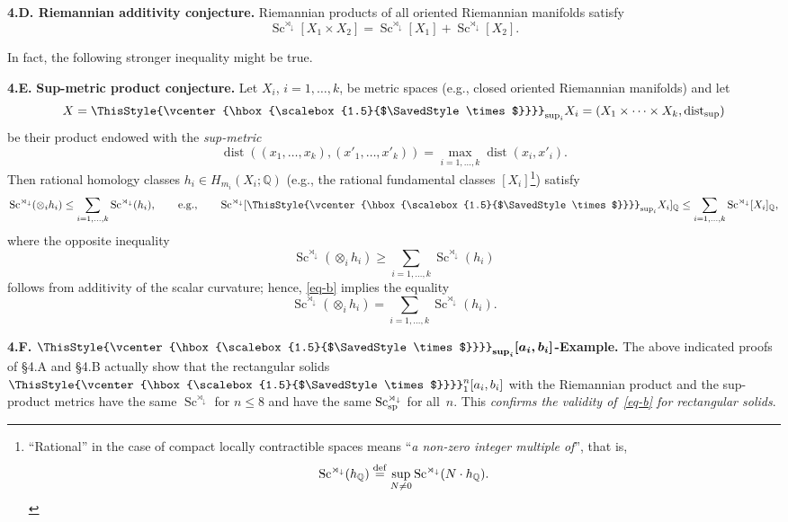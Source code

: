 \documentclass[pdftex]{sigma}
\numberwithin{equation}{section}
\newcommand\bigtimes{\mathbin{\ThisStyle{\vcenter{\hbox{%
\scalebox{1.5}{$\SavedStyle\times$}}}}}}
\begin{document}
\textbf {4.D. Riemannian additivity conjecture.}
Riemannian products of all oriented Riemannian manifolds satisfy
\[
\operatorname{Sc}^{\rtimes_\downarrow}[X_1\times X_2]= \operatorname{Sc}^{\rtimes_\downarrow}[X_1]+ \operatorname{Sc}^{\rtimes_\downarrow}[X_2].
\]

In fact, the following stronger inequality might be true.

\textbf {4.E.} \textbf{Sup-metric product conjecture.} Let $X_i$, $i=1,\dots,k$, be metric spaces (e.g., closed oriented Riemannian
 manifolds) and let
\[
X=\bigtimes_{\sup_i} X_i=
 (X_1
 \times \cdots \times X_k, \operatorname{dist}_{\sup})
 \]
be their product endowed with the {\it sup-metric}
\[
\operatorname{dist}((x_1,\dots,x_k), (x'_1,\dots,x'_k))=\max_{i=1,\dots,k} \operatorname{dist}(x_i, x'_i).
\]
Then rational homology classes $h_i\in H_{m_i}(X_i;\mathbb Q)$ (e.g., the rational fundamental classes $[X_i]$\footnote{``Rational'' in the case of compact locally contractible spaces means ``{\it a non-zero integer multiple of}'', that is,
\[
\operatorname{Sc}^{\rtimes_\downarrow}( h_\mathbb Q) \overset{\rm def}{=}
\sup_{N\neq 0}\operatorname{Sc}^{\rtimes_\downarrow}(N\cdot h_\mathbb Q).
\]})
satisfy
\begin{equation}\label{eq-b}
 \operatorname{Sc}^{\rtimes_\downarrow}( \otimes_i h_i)\leq\sum_{i=1,\dots,k} \operatorname{Sc}^{\rtimes_\downarrow}( h_i ), \qquad \text{e.g.,} \qquad \operatorname{Sc}^{\rtimes_\downarrow}[ \bigtimes_{\sup_i} X_i]_{\mathbb Q}\leq\sum_{i=1,\dots,k} \operatorname{Sc}^{\rtimes_\downarrow} [X_i]_{\mathbb Q},
 \end{equation}
where the opposite inequality
\[
\operatorname{Sc}^{\rtimes_\downarrow}( \otimes_i h_i )\geq\sum_{i=1,\dots,k} \operatorname{Sc}^{\rtimes_\downarrow}( h_i )
\]
follows from additivity of the scalar curvature;
hence, \eqref{eq-b} implies the equality
\[
 \operatorname{Sc}^{\rtimes_\downarrow} ( \otimes_i h_i) =\sum_{i=1,\dots,k} \operatorname{Sc}^{\rtimes_\downarrow} (h_i).
 \]

\textbf{4.F. $\boldsymbol{\bigtimes_{\sup_i}[a_i,b_i]}$-Example.}
The above indicated proofs of \S4.A and \S4.B actually show that the rectangular solids $\bigtimes_1^n[a_i,b_i]$ with the Riemannian product and the sup-product metrics have the same $\operatorname{Sc}^{\rtimes_\downarrow}$ for $n\leq8$ and
have the same $\operatorname{Sc}^{\rtimes_\downarrow}_{\rm sp}$ for all~$n$.
This {\it confirms the validity of~\eqref{eq-b} for rectangular solids}.
\end{document}
